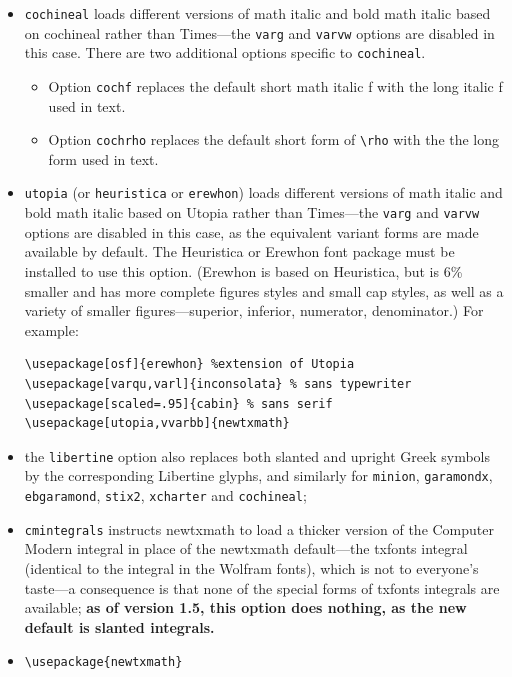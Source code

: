 \documentclass[\fsc]{article}
\theoremstyle{oldplain}
\theoremstyle{plain}
\begin{document}
\begin{itemize}
\item {\tt cochineal}  loads different versions of math italic and bold math italic based on \textsf{cochineal} rather than \textsf{Times}---the {\tt varg} and {\tt varvw} options are disabled in this case. There are two additional options specific to {\tt cochineal}.
\begin{itemize}
\item
Option {\tt cochf} replaces the default short math italic f with the long italic f used in text.
\item Option {\tt cochrho} replaces the default short form of \verb|\rho| with the the long form used in text.
\end{itemize}
\item {\tt utopia} (or {\tt heuristica} or {\tt erewhon}) loads different versions of math italic and bold math italic based on \textsf{Utopia} rather than \textsf{Times}---the {\tt varg} and {\tt varvw} options are disabled in this case, as the equivalent variant forms are made available by default. The Heuristica or Erewhon font package must be installed to use this option. (Erewhon is based on Heuristica, but is 6\% smaller and has more complete figures styles and small cap styles, as well as a variety of smaller figures---superior, inferior, numerator, denominator.)  For example:
\begin{verbatim}
\usepackage[osf]{erewhon} %extension of Utopia
\usepackage[varqu,varl]{inconsolata} % sans typewriter
\usepackage[scaled=.95]{cabin} % sans serif
\usepackage[utopia,vvarbb]{newtxmath}
\end{verbatim}
\item the {\tt libertine} option also replaces both slanted and upright Greek  symbols by the corresponding Libertine glyphs, and similarly for {\tt minion}, {\tt garamondx}, {\tt ebgaramond}, {\tt stix2}, {\tt xcharter} and {\tt cochineal};
\item
{\tt cmintegrals} instructs \textsf{newtxmath} to load a thicker version of the Computer Modern integral in place of the \textsf{newtxmath} default---the txfonts integral (identical to the integral in the Wolfram fonts), which is not to everyone's taste---a consequence is that none of the special forms of \textsf{txfonts} integrals are available;
\textbf{as of version 1.5, this option does nothing, as the new default is slanted integrals.}
\item 
\verb|\usepackage{newtxmath}|

\end{itemize}
\end{document}

